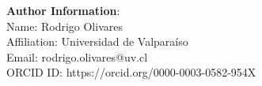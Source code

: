 \documentclass[11pt]{article}
\begin{document}
\textbf{Author Information}:\\

Name: Rodrigo Olivares\\
Affiliation: Universidad de Valpara\'iso\\
Email: rodrigo.olivares@uv.cl\\
ORCID ID: https://orcid.org/0000-0003-0582-954X\\ 
\end{document}
